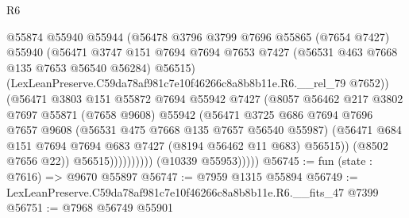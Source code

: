 \begin{lexlean}{R6}
\begin{coremodule}
                              @55874
                              @55940
                              @55944
                              (@56478
                                @3796
                                @3799
                                @7696
                                @55865
                                (@7654 @7427)
                                @55940
                                (@56471
                                  @3747
                                  @151
                                  @7694
                                  @7694
                                  @7653
                                  @7427
                                  (@56531 @463 @7668 @135 @7653 @56540 @56284)
                                  @56515)
                                (LexLeanPreserve.C59da78af981c7e10f46266c8a8b8b11e.R6.__rel_79
                                  @7652))
                              (@56471
                                @3803
                                @151
                                @55872
                                @7694
                                @55942
                                @7427
                                (@8057
                                  @56462
                                  @217
                                  @3802
                                  @7697
                                  @55871
                                  (@7658 @9608)
                                  @55942
                                  (@56471
                                    @3725
                                    @686
                                    @7694
                                    @7696
                                    @7657
                                    @9608
                                    (@56531 @475 @7668 @135 @7657 @56540 @55987)
                                    (@56471
                                      @684
                                      @151
                                      @7694
                                      @7694
                                      @683
                                      @7427
                                      (@8194 @56462 @11 @683)
                                      @56515))
                                  (@8502 @7656 @22))
                                @56515))))))))))
            (@10339 @55953)))))
@56745 := fun (state : @7616) => @9670 @55897
@56747 := @7959 @1315 @55894
@56749 := LexLeanPreserve.C59da78af981c7e10f46266c8a8b8b11e.R6.__fits_47 @7399
@56751 := @7968 @56749 @55901

\end{coremodule}
\end{lexlean}
